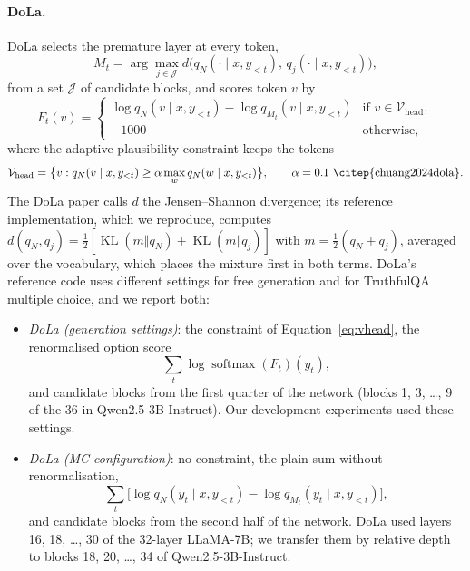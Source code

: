 \documentclass[11pt]{article}
\newcommand{\mainmodel}{Qwen2.5-3B-Instruct}
\newcommand{\KL}{\operatorname{KL}}
\newcommand{\Vhead}{\mathcal{V}_{\mathrm{head}}}
\begin{document}
\paragraph{DoLa.}
DoLa selects the premature layer at every token,
\begin{equation}
  M_t = \arg\max_{j \in \mathcal{J}} d\bigl(q_N(\cdot \mid x, y_{<t}),\, q_j(\cdot \mid x, y_{<t})\bigr),
  \label{eq:dola-select}
\end{equation}
from a set $\mathcal{J}$ of candidate blocks, and scores token $v$ by
\begin{equation}
  F_t(v) =
  \begin{cases}
    \log q_N(v \mid x, y_{<t}) - \log q_{M_t}(v \mid x, y_{<t}) & \text{if } v \in \Vhead,\\
    -1000 & \text{otherwise,}
  \end{cases}
  \label{eq:dola-score}
\end{equation}
where the adaptive plausibility constraint keeps the tokens
\begin{equation}
  \Vhead = \bigl\{v : q_N(v \mid x, y_{<t}) \ge \alpha \max_w q_N(w \mid x, y_{<t})\bigr\},
  \qquad \alpha = 0.1~\text{\citep{chuang2024dola}}.
  \label{eq:vhead}
\end{equation} The DoLa paper calls $d$ the Jensen--Shannon divergence; its reference
implementation, which we reproduce, computes $d(q_N, q_j) = \tfrac12[\KL(m \Vert q_N) + \KL(m \Vert q_j)]$ with
$m = \tfrac12(q_N + q_j)$, averaged over the vocabulary, which places the mixture first in both terms. DoLa's
reference code uses different settings for free generation and for TruthfulQA multiple choice, and we report both:
\begin{itemize}
\item \emph{DoLa (generation settings)}: the constraint of Equation~\eqref{eq:vhead}, the renormalised option score
  \[ \textstyle \sum_t \log \operatorname{softmax}(F_t)(y_t), \]
  and candidate blocks from the first quarter of the network (blocks 1, 3, \dots, 9 of the 36 in \mainmodel{}).
  Our development experiments used these settings.
\item \emph{DoLa (MC configuration)}: no constraint, the plain sum without renormalisation,
  \[ \textstyle \sum_t \bigl[\log q_N(y_t \mid x, y_{<t}) - \log q_{M_t}(y_t \mid x, y_{<t})\bigr], \]
  and candidate blocks from the second half of the network. DoLa used layers 16, 18, \dots, 30 of the 32-layer
  LLaMA-7B; we transfer them by relative depth to blocks 18, 20, \dots, 34 of \mainmodel{}.
\end{itemize}
\end{document}
